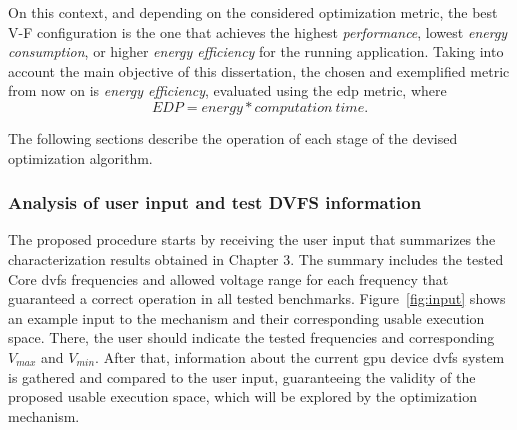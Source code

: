 On this context, and depending on the considered optimization metric, the best V-F configuration is the one that achieves the highest \textit{performance}, lowest \textit{energy consumption}, or higher \textit{energy efficiency} for the running application. Taking into account the main objective of this dissertation, the chosen and exemplified metric from now on is \textit{energy efficiency}, evaluated using the \acrshort{edp} metric, where 
\begin{equation}
	EDP=energy * computation \: time.
	\label{eq:edp}
\end{equation}

The following sections describe the operation of each stage of the devised optimization algorithm.

\subsubsection{Analysis of user input and test DVFS information}

The proposed procedure starts by receiving the user input that summarizes the characterization results obtained in Chapter 3. The summary includes the tested Core \acrshort{dvfs} frequencies and allowed voltage range for each frequency that guaranteed a correct operation in all tested benchmarks. Figure~\ref{fig:input} shows an example input to the mechanism and their corresponding usable execution space. There, the user should indicate the tested frequencies and corresponding $V_{max}$ and $V_{min}$. After that, information about the current \acrshort{gpu} device \acrshort{dvfs} system is gathered and compared to the user input, guaranteeing the validity of the proposed usable execution space, which will be explored by the optimization mechanism.



